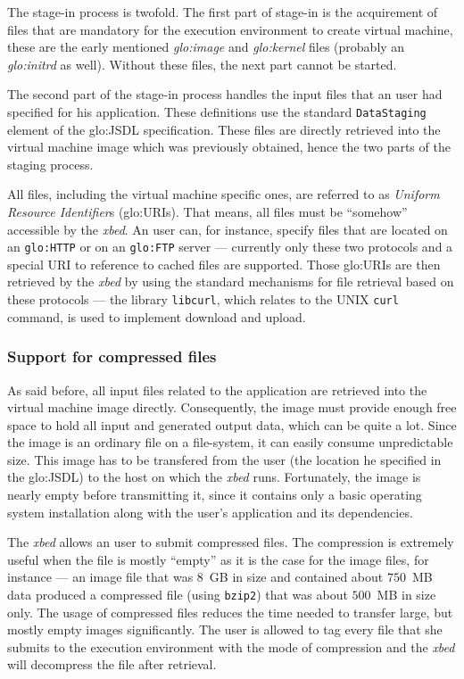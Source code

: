 The  stage-in process  is  twofold.  The  first  part of  stage-in is  the
acquirement of files  that are mandatory for the  execution environment to
create    virtual    machine,    these    are    the    early    mentioned
\emph{\gls{glo:image}}  and  \emph{\gls{glo:kernel}}  files  (probably  an
\emph{\gls{glo:initrd}}  as well).   Without  these files,  the next  part
cannot be started.

The second  part of the stage-in  process handles the input  files that an
user had specified for his application. These definitions use the standard
\texttt{DataStaging}  element of  the \gls{glo:JSDL}  specification. These
files  are directly  retrieved into  the virtual  machine image  which was
previously obtained, hence the two parts of the staging process.

All files, including the virtual machine specific ones, are referred to as
\emph{Uniform  Resource  Identifier}s  (\gls{glo:URI}s). That  means,  all
files must be ``somehow'' accessible by the \emph{xbed}.  An user can, for
instance, specify files that  are located on an \texttt{\gls{glo:HTTP}} or
on an \texttt{\gls{glo:FTP}} server --- currently only these two protocols
and  a special  URI to  reference to  cached files  are  supported.  Those
\gls{glo:URI}s are then retrieved by the \emph{xbed} by using the standard
mechanisms for  file retrieval  based on these  protocols ---  the library
\texttt{libcurl}, which relates to the UNIX \texttt{curl} command, is used
to implement download and upload.

\subsubsection{Support for compressed files}

As said before,  all input files related to  the application are retrieved
into  the virtual  machine image  directly. Consequently,  the  image must
provide enough  free space  to hold all  input and generated  output data,
which  can be  quite a  lot. Since  the  image is  an ordinary  file on  a
file-system, it can  easily consume unpredictable size. This  image has to
be  transfered  from  the user  (\ie  the  location  he specified  in  the
\gls{glo:JSDL}) to  the host on  which the \emph{xbed}  runs. Fortunately,
the image is nearly empty before transmitting it, since it contains only a
basic operating system installation  along with the user's application and
its dependencies.

The \emph{xbed} allows an user to submit compressed files. The compression
is extremely  useful when the file is  mostly ``empty'' as it  is the case
for the  image files, for  instance --- an  image file that was  $8$~GB in
size and contained  about $750$~MB data produced a  compressed file (using
\texttt{bzip2})  that was  about  $500$~MB  in size  only.   The usage  of
compressed files  reduces the  time needed to  transfer large,  but mostly
empty images significantly. The user is allowed to tag every file that she
submits to the execution environment  with the mode of compression and the
\emph{xbed} will decompress the file after retrieval.

